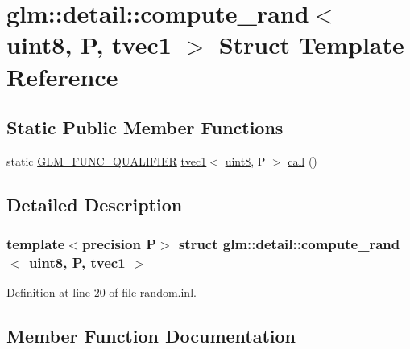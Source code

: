 \hypertarget{structglm_1_1detail_1_1compute__rand_3_01uint8_00_01_p_00_01tvec1_01_4}{}\section{glm\+::detail\+::compute\+\_\+rand$<$ uint8, P, tvec1 $>$ Struct Template Reference}
\label{structglm_1_1detail_1_1compute__rand_3_01uint8_00_01_p_00_01tvec1_01_4}
\subsection*{Static Public Member Functions}
\begin{DoxyCompactItemize}
\item 
static \mbox{\hyperlink{setup_8hpp_a33fdea6f91c5f834105f7415e2a64407}{G\+L\+M\+\_\+\+F\+U\+N\+C\+\_\+\+Q\+U\+A\+L\+I\+F\+I\+ER}} \mbox{\hyperlink{structglm_1_1tvec1}{tvec1}}$<$ \mbox{\hyperlink{namespaceglm_1_1detail_aef2588f97d090cc19fbbe0c74fe17c8f}{uint8}}, P $>$ \mbox{\hyperlink{structglm_1_1detail_1_1compute__rand_3_01uint8_00_01_p_00_01tvec1_01_4_abdfb11bac3bebc1ea1a6a77445291fd0}{call}} ()
\end{DoxyCompactItemize}


\subsection{Detailed Description}
\subsubsection*{template$<$precision P$>$\newline
struct glm\+::detail\+::compute\+\_\+rand$<$ uint8, P, tvec1 $>$}



Definition at line 20 of file random.\+inl.



\subsection{Member Function Documentation}
\mbox{\label{structglm_1_1detail_1_1compute__rand_3_01uint8_00_01_p_00_01tvec1_01_4_abdfb11bac3bebc1ea1a6a77445291fd0}} 
